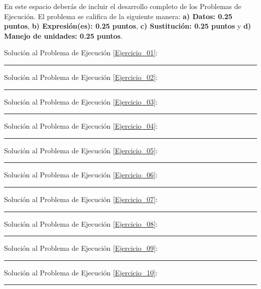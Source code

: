 \documentclass[12pt, letter]{exam}
\begin{document}
\newpage

En este espacio deberás de incluir el desarrollo completo de los Problemas de Ejecución. El problema se califica de la siguiente manera: \textbf{a) Datos: 0.25 puntos}, \textbf{b) Expresión(es): 0.25 puntos}, \textbf{c) Sustitución: 0.25 puntos} y \textbf{d) Manejo de unidades: 0.25 puntos}.

\vspace*{0.5cm}

Solución al Problema de Ejecución \ref{Ejercicio_01}:

\vspace*{3.5cm}
\rule{0.9\textwidth}{0.3mm}

Solución al Problema de Ejecución \ref{Ejercicio_02}:

\vspace*{3.5cm}
\rule{0.9\textwidth}{0.3mm}

Solución al Problema de Ejecución \ref{Ejercicio_03}:

\vspace*{3.5cm}
\rule{0.9\textwidth}{0.3mm}

Solución al Problema de Ejecución \ref{Ejercicio_04}:


\newpage

\rule{0.9\textwidth}{0.3mm}

Solución al Problema de Ejecución \ref{Ejercicio_05}:

\vspace*{3.5cm}
\rule{0.9\textwidth}{0.3mm}

Solución al Problema de Ejecución \ref{Ejercicio_06}:

\vspace*{3.5cm}
\rule{0.9\textwidth}{0.3mm}

Solución al Problema de Ejecución \ref{Ejercicio_07}:

\vspace*{3.5cm}
\rule{0.9\textwidth}{0.3mm}

Solución al Problema de Ejecución \ref{Ejercicio_08}:

\vspace*{3.5cm}
\rule{0.9\textwidth}{0.3mm}

Solución al Problema de Ejecución \ref{Ejercicio_09}:

\newpage

\rule{0.9\textwidth}{0.3mm}

Solución al Problema de Ejecución \ref{Ejercicio_10}:

\vspace*{3.5cm}
\rule{0.9\textwidth}{0.3mm}
\end{document}
